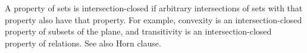 A property of sets is intersection-closed
if arbitrary intersections of sets with that property also have that
property. For example, convexity is an
intersection-closed property of subsets of the plane, and
transitivity is an intersection-closed property
of relations. See also Horn clause.


